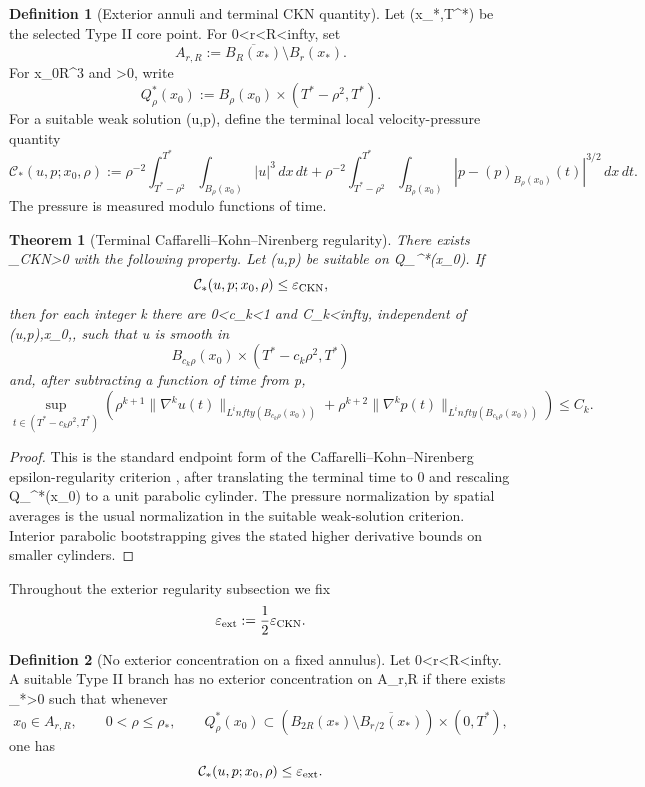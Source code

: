 \documentclass[11pt]{amsart}
\def\({}%
\def\){}%
\def\mathbb#1{#1}%
\def\infty{infty}%
\theoremstyle{plain}
\newtheorem{theorem}{Theorem}[section]
\theoremstyle{definition}
\newtheorem{definition}[definition]{Definition}
\theoremstyle{remark}
\begin{document}
\begin{definition}[Exterior annuli and terminal CKN quantity]
\label{paper8:def:exterior-ckn-quantity}
Let \((x_*,T^*)\) be the selected Type II core point.  For
\(0<r<R<\infty\), set
\[
  A_{r,R}:=\overline{B_R(x_*)}\setminus B_r(x_*).
\]
For \(x_0\in\mathbb R^3\) and \(\rho>0\), write
\[
  Q_\rho^*(x_0):=
  B_\rho(x_0)\times(T^*-\rho^2,T^*).
\]
For a suitable weak solution \((u,p)\), define the terminal local
velocity-pressure quantity
\[
  \mathcal C_*(u,p;x_0,\rho)
  :=
  \rho^{-2}
  \int_{T^*-\rho^2}^{T^*}\int_{B_\rho(x_0)} |u|^3\,dx\,dt
  +
  \rho^{-2}
  \int_{T^*-\rho^2}^{T^*}\int_{B_\rho(x_0)}
  |p-(p)_{B_\rho(x_0)}(t)|^{3/2}\,dx\,dt .
\]
The pressure is measured modulo functions of time.
\end{definition}

\begin{theorem}[Terminal Caffarelli--Kohn--Nirenberg regularity]
\label{paper8:thm:terminal-ckn-regularity}
There exists \(\varepsilon_{\rm CKN}>0\) with the following property.  Let
\((u,p)\) be suitable on \(Q_\rho^*(x_0)\).  If
\[
  \mathcal C_*(u,p;x_0,\rho)\le\varepsilon_{\rm CKN},
\]
then for each integer \(k\) there are \(0<c_k<1\) and \(C_k<\infty\), independent of
\((u,p),x_0,\rho\), such that \(u\) is smooth in
\[
  B_{c_k\rho}(x_0)\times(T^*-c_k\rho^2,T^*)
\]
and, after subtracting a function of time from \(p\),
\[
  \sup_{t\in(T^*-c_k\rho^2,T^*)}
  \left(
  \rho^{k+1}\|\nabla^k u(t)\|_{L^\infty(B_{c_k\rho}(x_0))}
  +
  \rho^{k+2}\|\nabla^k p(t)\|_{L^\infty(B_{c_k\rho}(x_0))}
  \right)
  \le C_k .
\]
\end{theorem}

\begin{proof}
This is the standard endpoint form of the
Caffarelli--Kohn--Nirenberg epsilon-regularity criterion
\cite{CaffarelliKohnNirenberg1982,Lin1998}, after translating the terminal
time to \(0\) and rescaling \(Q_\rho^*(x_0)\) to a unit parabolic cylinder.
The pressure normalization by spatial averages is the usual normalization in
the suitable weak-solution criterion.  Interior parabolic bootstrapping gives
the stated higher derivative bounds on smaller cylinders.
\end{proof}

Throughout the exterior regularity subsection we fix
\[
  \varepsilon_{\rm ext}:=\frac12\varepsilon_{\rm CKN}.
\]

\begin{definition}[No exterior concentration on a fixed annulus]
\label{paper8:def:no-exterior-concentration-stratum}
Let \(0<r<R<\infty\).  A suitable Type II branch has no exterior concentration on \(A_{r,R}\) if
there exists \(\rho_*>0\) such that whenever
\[
  x_0\in A_{r,R},\qquad 0<\rho\le\rho_*,
  \qquad Q_\rho^*(x_0)\subset
  (B_{2R}(x_*)\setminus \overline{B_{r/2}(x_*)})\times(0,T^*),
\]
one has
\[
  \mathcal C_*(u,p;x_0,\rho)\le\varepsilon_{\rm ext}.
\]
\end{definition}
\end{document}
